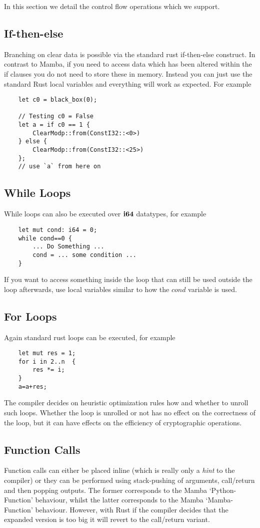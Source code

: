 In this section we detail the control flow operations which we
support.

\subsection{If-then-else}
Branching on clear data is possible via the standard
rust if-then-else construct. In contrast to Mamba, if you
need to access data which has been altered within the
if clauses you do not need to store these in memory.
Instead you can just use the standard Rust local variables
and everything will work as expected.
For example
\begin{lstlisting}
    let c0 = black_box(0);

    // Testing c0 = False
    let a = if c0 == 1 {
        ClearModp::from(ConstI32::<0>)
    } else {
        ClearModp::from(ConstI32::<25>)
    };
    // use `a` from here on
\end{lstlisting}

\subsection{While Loops}
While loops can also be executed over $\mathbf{i64}$ datatypes, for
example
\begin{lstlisting}
    let mut cond: i64 = 0;
    while cond==0 {
        ... Do Something ...
        cond = ... some condition ...
    }
\end{lstlisting}
If you want to access something inside the loop that can still be
used outside the loop afterwards, use local variables similar to
how the $cond$ variable is used.

\subsection{For Loops}
Again standard rust loops can be executed, for example
\begin{lstlisting}
    let mut res = 1;
    for i in 2..n  {
        res *= i;
    }
    a=a+res;
\end{lstlisting}
The compiler decides on heuristic optimization rules how and whether
to unroll such loops. Whether the loop is unrolled or not has no
effect on the correctness of the loop, but it can have effects on
the efficiency of cryptographic operations.

\subsection{Function Calls}
Function calls can either be placed inline (which is really only a
    {\em hint} to the compiler) or they can be performed using
stack-pushing of arguments, call/return and then popping outputs.
The former corresponds to the Mamba `Python-Function' behaviour,
whilst the latter corresponds to the Mamba `Mamba-Function' behaviour.
However, with Rust if the compiler decides that the expanded version
is too big it will revert to the call/return variant.

